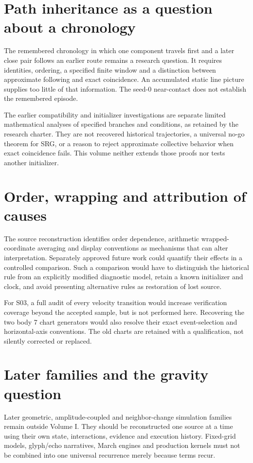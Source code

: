 \section{Path inheritance as a question about a chronology}
The remembered chronology in which one component travels first
and a later close pair follows an earlier route remains a research
question. It requires identities, ordering, a specified finite
window and a distinction between approximate following and exact
coincidence. An accumulated static line picture supplies too
little of that information. The seed-0 near-contact does not
establish the remembered episode. 

The earlier compatibility and initializer investigations are
separate limited mathematical analyses of specified branches and
conditions, as retained by the research charter. They are not
recovered historical trajectories, a universal no-go theorem for
SRG, or a reason to reject approximate collective behavior when
exact coincidence fails. This volume neither extends those proofs
nor tests another initializer. \cite{charter,volumeorder}

\section{Order, wrapping and attribution of causes}
The source reconstruction identifies order dependence,
arithmetic wrapped-coordinate averaging and display conventions
as mechanisms that can alter interpretation. Separately approved
future work could quantify their effects in a controlled
comparison. Such a comparison would have to distinguish the
historical rule from an explicitly modified diagnostic model,
retain a known initializer and clock, and avoid presenting
alternative rules as restoration of lost source.

For S03, a full audit of every velocity transition would increase
verification coverage beyond the accepted sample, but is not
performed here. Recovering the two body 7 chart generators would
also resolve their exact event-selection and horizontal-axis
conventions. The old charts are retained with a qualification,
not silently corrected or replaced. 

\section{Later families and the gravity question}
Later geometric, amplitude-coupled and neighbor-change simulation
families remain outside Volume I. They should be reconstructed
one source at a time using their own state, interactions, evidence
and execution history. Fixed-grid models, glyph/echo narratives,
March engines and production kernels must not be combined into
one universal recurrence merely because terms recur.
\cite{charter} 


